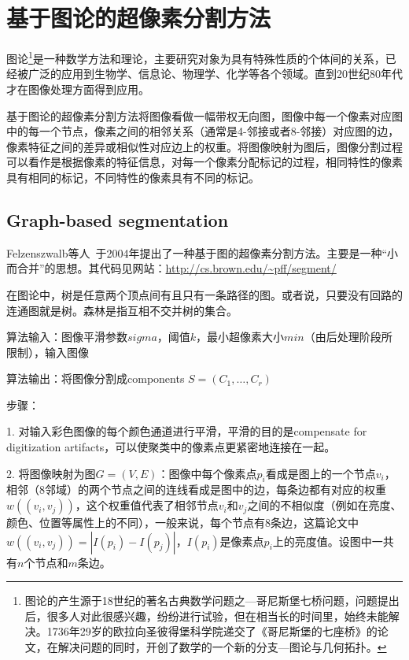 \documentclass[12pt]{article}
\begin{document}
\section{基于图论的超像素分割方法}

图论\footnote{图论的产生源于18世纪的著名古典数学问题之---哥尼斯堡七桥问题，问题提出后，很多人对此很感兴趣，纷纷进行试验，但在相当长的时间里，始终未能解决。1736年29岁的欧拉向圣彼得堡科学院递交了《哥尼斯堡的七座桥》的论文，在解决问题的同时，开创了数学的一个新的分支---图论与几何拓扑。}是一种数学方法和理论，主要研究对象为具有特殊性质的个体间的关系，已经被广泛的应用到生物学、信息论、物理学、化学等各个领域。直到20世纪80年代才在图像处理方面得到应用。

基于图论的超像素分割方法将图像看做一幅带权无向图，图像中每一个像素对应图中的每一个节点，像素之间的相邻关系（通常是4-邻接或者8-邻接）对应图的边，像素特征之间的差异或相似性对应边上的权重。将图像映射为图后，图像分割过程可以看作是根据像素的特征信息，对每一个像素分配标记的过程，相同特性的像素具有相同的标记，不同特性的像素具有不同的标记。


\subsection{Graph-based segmentation}

Felzenszwalb等人~\cite{felzenszwalb2004efficient}于2004年提出了一种基于图的超像素分割方法。主要是一种“小而合并”的思想。其代码见网站：\url{http://cs.brown.edu/~pff/segment/}

在图论中，树是任意两个顶点间有且只有一条路径的图。或者说，只要没有回路的连通图就是树。森林是指互相不交并树的集合。

算法输入：图像平滑参数$sigma$，阈值$k$，最小超像素大小$min$（由后处理阶段所限制），输入图像

算法输出：将图像分割成components $S = (C_1, \ldots, C_r)$

步骤：

1. 对输入彩色图像的每个颜色通道进行平滑，平滑的目的是compensate for digitization artifacts，可以使聚类中的像素点更紧密地连接在一起。

2. 将图像映射为图$G = (V, E)$：图像中每个像素点$p_i$看成是图上的一个节点$v_i$，相邻（8邻域）的两个节点之间的连线看成是图中的边，每条边都有对应的权重$w((v_i, v_j))$，这个权重值代表了相邻节点$v_i$和$v_j$之间的不相似度（例如在亮度、颜色、位置等属性上的不同），一般来说，每个节点有8条边，这篇论文中$w((v_i, v_j)) = |I(p_i)-I(p_j)|$，$I(p_i)$是像素点$p_i$上的亮度值。设图中一共有$n$个节点和$m$条边。
\end{document}

